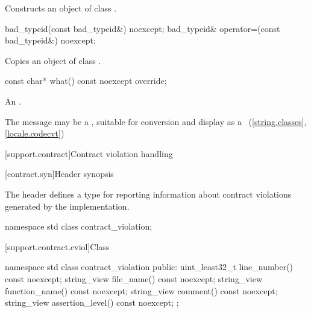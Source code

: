 \begin{itemdescr}
\pnum
\effects
Constructs an object of class
.
\end{itemdescr}

%
%
\begin{itemdecl}
bad_typeid(const bad_typeid&) noexcept;
bad_typeid& operator=(const bad_typeid&) noexcept;
\end{itemdecl}

\begin{itemdescr}
\pnum
\effects
Copies an object of class
.
\end{itemdescr}

%
\begin{itemdecl}
const char* what() const noexcept override;
\end{itemdecl}

\begin{itemdescr}
\pnum
\returns
An  \ntbs{}.

\pnum
\remarks
The message may be a
,
suitable for conversion and display as a
~(\ref{string.classes}, \ref{locale.codecvt})
\end{itemdescr}

[support.contract]{Contract violation handling}

[contract.syn]{Header  synopsis}

The header  defines a type
for reporting information about contract violations
generated by the implementation.
\begin{codeblock}
namespace std {
  class contract_violation;
}
\end{codeblock}

[support.contract.cviol]{Class }
%

\begin{codeblock}
namespace std {
  class contract_violation {
  public:
    uint_least32_t line_number() const noexcept;
    string_view file_name() const noexcept;
    string_view function_name() const noexcept;
    string_view comment() const noexcept;
    string_view assertion_level() const noexcept;
  };
}
\end{codeblock}

